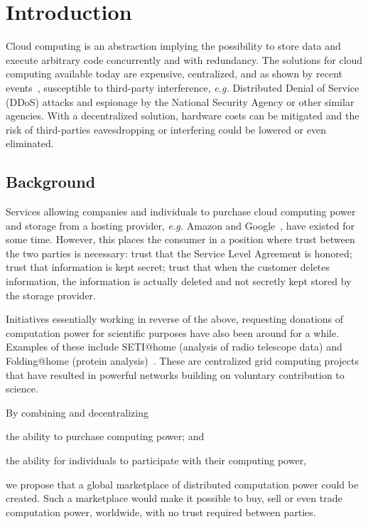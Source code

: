 \chapter{Introduction}
Cloud computing is an abstraction implying the possibility to store data and execute arbitrary code concurrently and with redundancy. The solutions for cloud computing available today are expensive, centralized, and as shown by recent events~\cite{economist:ddos}\cite{guardian:nsa}, susceptible to third-party interference, \emph{e.g.} Distributed Denial of Service (DDoS) attacks and espionage by the National Security Agency or other similar agencies. With a decentralized solution, hardware costs can be mitigated and the risk of third-parties eavesdropping or interfering could be lowered or even eliminated.

\section{Background}
Services allowing companies and individuals to purchase cloud computing power and storage from a hosting provider, \emph{e.g.} Amazon and Google~\cite{elasticcloud}\cite{appengine}, have existed for some time. However, this places the consumer in a position where trust between the two parties is necessary: trust that the Service Level Agreement is honored; trust that information is kept secret; trust that when the customer deletes information, the information is actually deleted and not secretly kept stored by the storage provider.

Initiatives essentially working in reverse of the above, requesting donations of computation power for scientific purposes have also been around for a while. Examples of these include SETI@home (analysis of radio telescope data) and Folding@home (protein analysis)~\cite{korpela:2012}. These are centralized grid computing projects that have resulted in powerful networks building on voluntary contribution to science.

By combining and decentralizing
\begin{inparaenum}
\item the ability to purchase computing power; and
\item the ability for individuals to participate with their computing power,
\end{inparaenum}
we propose that a global marketplace of distributed computation power could be created. Such a marketplace would make it possible to buy, sell or even trade computation power, worldwide, with no trust required between parties.

